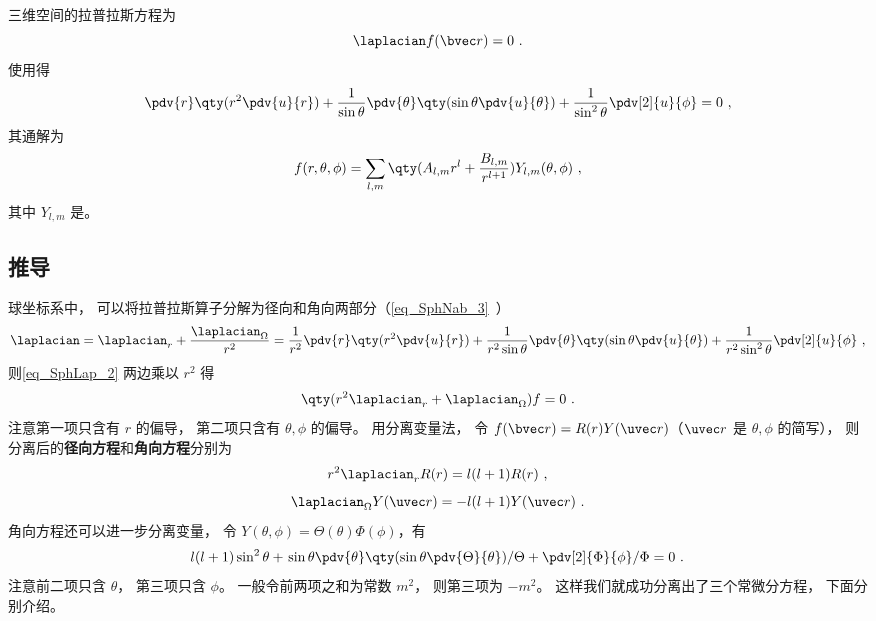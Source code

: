 

三维空间的拉普拉斯方程为
\begin{equation}\label{eq_SphLap_2}
\laplacian f(\bvec r) = 0~.
\end{equation}
使用得
\begin{equation}
\pdv{r} \qty(r^2 \pdv{u}{r}) + \frac{1}{\sin\theta}\pdv{\theta} \qty(\sin \theta \pdv{u}{\theta}) + \frac{1}{\sin^2 \theta} \pdv[2]{u}{\phi} = 0~,
\end{equation}
其通解为
\begin{equation}\label{eq_SphLap_7}
f(r, \theta, \phi) = \sum_{l,m} \qty(A_{l,m} r^l + \frac{B_{l,m}}{r^{l+1}}) Y_{l,m} (\theta, \phi)~,
\end{equation}
其中 $Y_{l,m}$ 是。

\subsection{推导}
球坐标系中， 可以将拉普拉斯算子分解为径向和角向两部分（\autoref{eq_SphNab_3}~）
\begin{equation}\label{eq_SphLap_5}
\laplacian = \laplacian_r + \frac{\laplacian_{\Omega}}{r^2} = \frac{1}{r^2} \pdv{r} \qty(r^2 \pdv{u}{r}) + \frac{1}{r^2\sin\theta}\pdv{\theta} \qty(\sin \theta \pdv{u}{\theta}) + \frac{1}{r^2\sin^2 \theta} \pdv[2]{u}{\phi}~,
\end{equation}
则\autoref{eq_SphLap_2} 两边乘以 $r^2$ 得
\begin{equation}
\qty(r^2\laplacian_r + \laplacian_\Omega) f = 0~.
\end{equation}
注意第一项只含有 $r$ 的偏导， 第二项只含有 $\theta,\phi$ 的偏导。 用分离变量法， 令 $f(\bvec r) = R(r) Y(\uvec r)$（$\uvec r$ 是 $\theta, \phi$ 的简写）， 则分离后的\textbf{径向方程}和\textbf{角向方程}分别为
\begin{equation}\label{eq_SphLap_4}
r^2\laplacian_r R(r) = l(l+1)R(r)~,
\end{equation}
\begin{equation}\label{eq_SphLap_1}
\laplacian_{\Omega} Y(\uvec r) = -l(l+1) Y(\uvec r)~.
\end{equation}
角向方程还可以进一步分离变量， 令 $Y(\theta,\phi) = \Theta(\theta)\Phi(\phi)$，有
\begin{equation}\label{eq_SphLap_3}
l(l+1)\sin^2 \theta + \left. \sin\theta\pdv{\theta} \qty(\sin \theta \pdv{\Theta}{\theta}) \middle/ \Theta + \pdv[2]{\Phi}{\phi} \middle/ \Phi = 0~. \right.
\end{equation}
注意前二项只含 $\theta$， 第三项只含 $\phi$。 一般令前两项之和为常数 $m^2$， 则第三项为 $-m^2$。 这样我们就成功分离出了三个常微分方程， 下面分别介绍。

